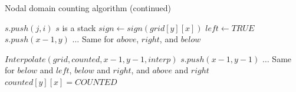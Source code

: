 \documentclass{report}
\begin{document}
\clearpage
\begin{algorithm}
  \ContinuedFloat
  \caption{Nodal domain counting algorithm (continued)}
  \begin{algorithmic}

        \State $s.push(j,i)$
        \Comment $s$ is a stack
            \State $sign \gets sign(grid[y][x])$
                    \State $left \gets TRUE$
                        \State $s.push(x-1,y)$
                    \EndIf
                \EndIf
            \EndIf
            \State $\ldots$ \Comment Same for $above$, $right$, and $below$


                      \State $Interpolate(grid, counted, x-1, y-1, interp)$
                  \EndIf
                      $s.push(x-1,y-1)$
                  \EndIf
                \EndIf
            \EndIf
            \State $\ldots$ \Comment Same for $below$ and $left$, $below$ and $right$, and $above$ and $right$
            \State $counted[y][x] = COUNTED$
        \EndWhile
    \EndFunction

  \end{algorithmic}
\end{algorithm}
\end{document}
